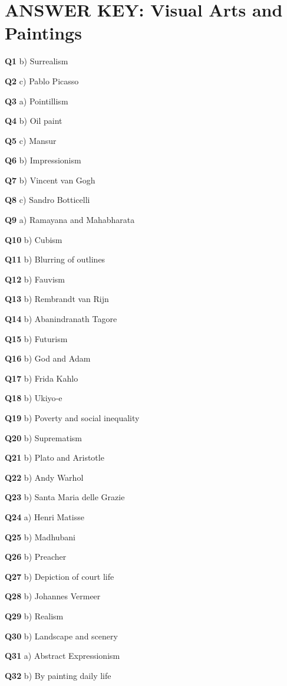 \section{ANSWER KEY: Visual Arts and Paintings}

\textbf{Q1} b) Surrealism\par
\textbf{Q2} c) Pablo Picasso\par
\textbf{Q3} a) Pointillism\par
\textbf{Q4} b) Oil paint\par
\textbf{Q5} c) Mansur\par
\textbf{Q6} b) Impressionism\par
\textbf{Q7} b) Vincent van Gogh\par
\textbf{Q8} c) Sandro Botticelli\par
\textbf{Q9} a) Ramayana and Mahabharata\par
\textbf{Q10} b) Cubism\par
\textbf{Q11} b) Blurring of outlines\par
\textbf{Q12} b) Fauvism\par
\textbf{Q13} b) Rembrandt van Rijn\par
\textbf{Q14} b) Abanindranath Tagore\par
\textbf{Q15} b) Futurism\par
\textbf{Q16} b) God and Adam\par
\textbf{Q17} b) Frida Kahlo\par
\textbf{Q18} b) Ukiyo‑e\par
\textbf{Q19} b) Poverty and social inequality\par
\textbf{Q20} b) Suprematism\par
\textbf{Q21} b) Plato and Aristotle\par
\textbf{Q22} b) Andy Warhol\par
\textbf{Q23} b) Santa Maria delle Grazie\par
\textbf{Q24} a) Henri Matisse\par
\textbf{Q25} b) Madhubani\par
\textbf{Q26} b) Preacher\par
\textbf{Q27} b) Depiction of court life\par
\textbf{Q28} b) Johannes Vermeer\par
\textbf{Q29} b) Realism\par
\textbf{Q30} b) Landscape and scenery\par
\textbf{Q31} a) Abstract Expressionism\par
\textbf{Q32} b) By painting daily life\par
